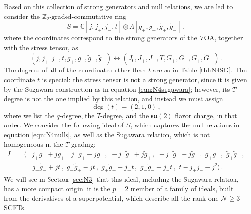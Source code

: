 \documentclass[12pt]{article}
\numberwithin{equation}{section}
\numberwithin{figure}{section}
\theoremstyle{plain}
\theoremstyle{definition}
\begin{document}
Based on this collection of strong generators and null relations, we are led to consider the $\mathbb{Z}_2$-graded-commutative ring
\begin{equation}
    S = \mathbb{C}[j, j_+, j_-, t] \otimes \Lambda[g_+, g_-, \widetilde{g}_+, \widetilde{g}_-] \,,
\end{equation}
where the coordinates correspond to the strong generators of the VOA, together with the stress tensor, as
\begin{equation}
    (j, j_+, j_-, t, g_+, g_-, \widetilde{g}_+, \widetilde{g}_-) \leftrightarrow (J_0, J_+, J_-, T, G_+, G_-, \widetilde{G}_+, \widetilde{G}_-) \,.
\end{equation}
The degrees of all of the coordinates other than $t$ are as in Table \ref{tbl:N4SG}. The coordinate $t$ is special: the stress tensor is not a strong generator, since it is given by the Sugawara construction as in equation \eqref{eqn:N4sugawara}; however, its $T$-degree is not the one implied by this relation, and instead we must assign
\begin{equation}
    \operatorname{deg}(t) = (2, 1, 0) \,,
\end{equation}
where we list the $q$-degree, the $T$-degree, and the $\mathfrak{su}(2)$ flavor charge, in that order. We consider the following ideal of $S$, which captures the null relations in equation \eqref{eqn:N4nulls}, as well as the Sugawara relation, which is not homogeneous in the $T$-grading:
\begin{equation}\label{eqn:N4ideal}
  \begin{aligned}
    I \,\,=\,\, \big( & j_+ g_- + j g_+ \,, \,\, j_- g_+ - j g_- \,, \,\, -j_+ \widetilde{g}_- + j \widetilde{g}_+ \,, \,\, -j_- \widetilde{g}_+ - j \widetilde{g}_- \,, \,\, g_+ g_- \,, \,\, \widetilde{g}_+ \widetilde{g}_- \,, \\ & g_+ \widetilde{g}_- + j t \,, \,\, g_- \widetilde{g}_+ - j t \,, \,\, g_+ \widetilde{g}_+ + j_+ t \,, \,\, g_- \widetilde{g}_- + j_- t \,, \,\, t - j_+ j_- - j^2 \big) \,.
  \end{aligned}
\end{equation}
We will see in Section \ref{sec:N3} that this ideal, including the Sugawara relation, has a more compact origin: it is the $p = 2$ member of a family of ideals, built from the derivatives of a superpotential, which describe all the rank-one $\mathcal{N}\geq 3$ SCFTs.
\end{document}

